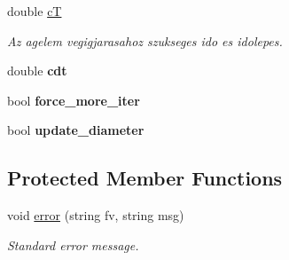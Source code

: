 \begin{DoxyCompactItemize}
double \hyperlink{class_agelem_a164f2afad3ab19d298c73a865e82aa0b}{cT}
\begin{DoxyCompactList}\small\item\em Az agelem vegigjarasahoz szukseges ido es idolepes. \end{DoxyCompactList}\item 
\mbox{\label{class_agelem_ab2e1162f1ae624444515fb09bcfa5e8e}} 
double {\bfseries cdt}
\item 
\mbox{\label{class_agelem_a2c9f1a19641baa978f764abfb0352e33}} 
bool {\bfseries force\+\_\+more\+\_\+iter}
\item 
\mbox{\label{class_agelem_a53ddaf1d1015bc6544c492123180cd60}} 
bool {\bfseries update\+\_\+diameter}
\end{DoxyCompactItemize}
\subsection*{Protected Member Functions}
\begin{DoxyCompactItemize}
\item 
\mbox{\label{class_agelem_acf0a31790483a62b9b1f46a2bd73b59a}} 
void \hyperlink{class_agelem_acf0a31790483a62b9b1f46a2bd73b59a}{error} (string fv, string msg)
\begin{DoxyCompactList}\small\item\em Standard error message. \end{DoxyCompactList}\end{DoxyCompactItemize}
